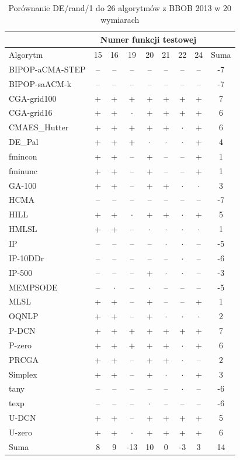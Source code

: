 \documentclass[a4paper,onecolumn,oneside,12pt,wide,floatssmall]{mwrep}
\theoremstyle{definition}
\theoremstyle{plain}%
\theoremstyle{remark}
\begin{document}
\begin{table}[H]
\centering
\begin{tabular}{ | l | c | c | c | c | c | c | c | c | }
\hline		 & \multicolumn{7}{c|}{Numer funkcji testowej} & \\  \hline
Algorytm         &15& 16& 19& 20& 21& 22& 24 & Suma \\  \hline
BIPOP-aCMA-STEP	 & -- & -- & -- & -- & -- & -- & -- & -7\\
BIPOP-saACM-k	 & -- & -- & -- & -- & -- & -- & -- & -7\\
CGA-grid100	 & + & + & + & + & + & + & + & 7\\
CGA-grid16	 & + & + & $\cdot$ & + & + & + & + & 6\\
CMAES\_Hutter	 & + & + & + & + & + & $\cdot$ & + & 6\\
DE\_Pal	 & + & + & + & $\cdot$ & $\cdot$ & $\cdot$ & + & 4\\
fmincon	 & + & + & -- & + & -- & -- & + & 1\\
fminunc	 & + & + & -- & + & -- & -- & + & 1\\
GA-100	 & + & + & -- & + & + & $\cdot$ & $\cdot$ & 3\\
HCMA	 & -- & -- & -- & -- & -- & -- & -- & -7 \\
HILL	 & + & + & $\cdot$ & + & + & $\cdot$ & + & 5\\
HMLSL	 & + & + & -- & $\cdot$ & $\cdot$ & $\cdot$ & $\cdot$ & 1\\
IP	 & -- & -- & -- & -- & $\cdot$ & $\cdot$ & -- & -5 \\
IP-10DDr	 & -- & -- & -- & -- & -- & $\cdot$ & -- & -6\\
IP-500	 & -- & -- & -- & + & $\cdot$ & $\cdot$ & -- & -3\\
MEMPSODE	 & -- & $\cdot$ & -- & $\cdot$ & -- & -- & -- & -5\\
MLSL	 & + & + & -- & + & -- & -- & + & 1\\
OQNLP	 & + & + & -- & + & $\cdot$ & $\cdot$ & $\cdot$ & 2\\
P-DCN	 & + & + & + & + & + & + & + & 7\\
P-zero	 & + & + & + & + & + & $\cdot$ & + & 6\\
PRCGA	 & + & + & -- & + & + & $\cdot$ & -- & 2\\
Simplex	 & + & + & -- & + & $\cdot$ & $\cdot$ & + & 3\\
tany	 & -- & -- & -- & -- & -- & $\cdot$ & -- & -6\\
texp	 & -- & -- & -- & $\cdot$ & -- & -- & -- & -6\\
U-DCN	 & + & + & -- & + & + & + & + & 5 \\
U-zero	 & + & + & $\cdot$ & + & + & + & + & 6\\ \hline
Suma     & 8 & 9 & -13 & 10 & 0 & -3 & 3 & 14 \\ \hline
\end{tabular}
\caption{Porównanie DE/rand/1 do 26 algorytmów z BBOB 2013 w 20 wymiarach}
\label{table:bbob2013rand20}
\end{table}
\end{document}
